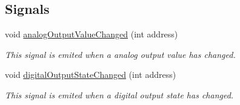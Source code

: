 \subsection*{Signals}
\begin{DoxyCompactItemize}
\item 
void \hyperlink{classmdt_device_ios_a78918905dc0b04976cdc826c0fd582c1}{analogOutputValueChanged} (int address)
\begin{DoxyCompactList}\small\item\em This signal is emited when a analog output value has changed. \end{DoxyCompactList}\item 
void \hyperlink{classmdt_device_ios_a45be7941f710e63a7d54020dee38e2ec}{digitalOutputStateChanged} (int address)
\begin{DoxyCompactList}\small\item\em This signal is emited when a digital output state has changed. \end{DoxyCompactList}\end{DoxyCompactItemize}
